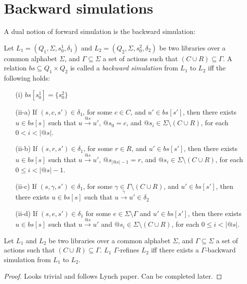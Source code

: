 \section{Backward simulations}\label{app:backSim}

A dual notion of forward simulation is the backward simulation:
\begin{dfn}
Let $L_1=(Q_1,\Sigma, s_0^1, \delta_1)$ and $L_2=(Q_2,\Sigma, s_0^2, \delta_2)$ be two libraries over a common alphabet $\Sigma$, and $\Gamma\subseteq \Sigma$ a set of actions such that $(C\cup R)\subseteq \Gamma$. A relation $bs \subseteq Q_1 \times Q_2$ is called a \emph{backward simulation} from $L_1$ to $L_2$ iff the following holds:
\begin{itemize}
\item[(i)] $bs[s_0^1] = \{s_0^2 \}$
\item[(ii-a)] If $(s,c,s') \in \delta_1$, for some $c\in C$, and $u' \in bs[s']$, then there exists $u \in bs[s]$ such that $u \xrightarrow{@s} u'$, $@s_0=c$, and $@s_i\in \Sigma\setminus(C\cup R)$, for each $0<i<|@s|$.
\item[(ii-b)] If $(s,r,s') \in \delta_1$, for some $r\in R$, and $u' \in bs[s']$, then there exists $u \in bs[s]$ such that $u \xrightarrow{@s} u'$, $@s_{|@s| -1}=r$, and $@s_i\in \Sigma\setminus(C\cup R)$, for each $0\leq i<|@s| -1$.
\item[(ii-c)] If $(s,\gamma, s') \in \delta_1$, for some $\gamma\in \Gamma\setminus (C\cup R)$, and $u' \in bs[s']$, then there exists $u \in bs[s]$ such that $u\xrightarrow{\gamma} u' \in \delta_2$
\item[(ii-d)] If $(s,e,s') \in \delta_1$ for some $e \in \Sigma\setminus \Gamma$ and $u' \in bs[s']$, then there exists $u \in bs[s]$ such that $u \xrightarrow{@s} u'$ and $@s_i\in \Sigma\setminus(C\cup R)$, for each $0\leq i<|@s|$.
\end{itemize}
\end{dfn}

\begin{lem}
Let $L_1$ and $L_2$ be two libraries over a common alphabet $\Sigma$, and $\Gamma\subseteq \Sigma$ a set of actions such that $(C\cup R)\subseteq \Gamma$. $L_1$ $\Gamma$-refines $L_2$ if{f} there exists a $\Gamma$-backward simulation from $L_1$ to $L_2$.
\end{lem}
\begin{proof}
Looks trivial and follows Lynch paper. Can be completed later.
\end{proof}
